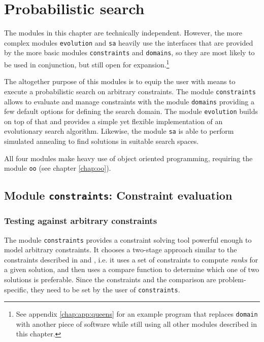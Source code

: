 \chapter{Probabilistic search}
\label{chap:evolution}

The modules in this chapter are technically independent. However, the more complex modules \texttt{evolution} and \texttt{sa} heavily use the interfaces that are provided by the more basic modules \texttt{constraints} and \texttt{domains}, so they are most likely to be used in conjunction, but still open for expansion.\footnote{See appendix \ref{chap:app:queens} for an example program that replaces \texttt{domain} with another piece of software while still using all other modules described in this chapter.}

The altogether purpose of this modules is to equip the user with means to execute a probabilistic search on arbitrary constraints. The module \texttt{constraints} allows to evaluate and manage constraints with the module \texttt{domains} providing a few default options for defining the search domain. The module \texttt{evolution} builds on top of that and provides a simple yet flexible implementation of an evolutionary search algorithm. Likewise, the module \texttt{sa} is able to perform simulated annealing to find solutions in suitable search spaces.

All four modules make heavy use of object oriented programming, requiring the module \texttt{oo} (see chapter \ref{chap:oo}).

\section{Module \texttt{constraints}: Constraint evaluation}
\label{sec:evolution:constraints}

\subsection{Testing against arbitrary constraints}

The module \texttt{constraints} provides a constraint solving tool powerful enough to model arbitrary constraints. It chooses a two-stage approach similar to the constraints described in \cite{WirsingHoelzlEtAl2006} and \cite{HoelzlMeierWirsing2009}, i.e. it uses a set of constraints to compute \emph{ranks} for a given solution, and then uses a compare function to determine which one of two solutions is preferable. Since the constraints and the comparison are problem-specific, they need to be set by the user of \texttt{constraints}.

